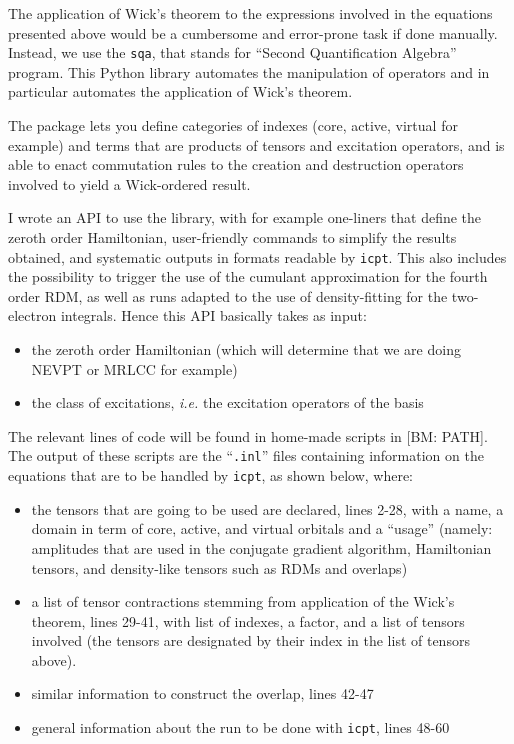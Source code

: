 \documentclass{article}
\newcommand  \todo[1]      {{\color{blue}[BM: #1]}}
\newcommand  \var[1]       {\texttt{#1}}
\begin{document}
The application of Wick's theorem to the expressions involved in the equations presented above
would be a cumbersome and error-prone task if done manually.
Instead, we use the \var{sqa}, that stands for ``Second Quantification Algebra'' program.
This Python library automates the manipulation of operators and in particular automates
the application of Wick's theorem.

The package lets you define categories of indexes (core, active, virtual for example)
and terms that are products of tensors and excitation operators,
and is able to enact commutation rules to the creation and destruction operators involved
to yield a Wick-ordered result.

I wrote an API to use the library, with for example one-liners that define the zeroth order Hamiltonian,
user-friendly commands to simplify the results obtained,
and systematic outputs in formats readable by \var{icpt}.
This also includes the possibility to trigger the use of the cumulant approximation for the fourth order RDM,
as well as runs adapted to the use of density-fitting for the two-electron integrals.
Hence this API basically takes as input:
\begin{itemize}
\item the zeroth order Hamiltonian (which will determine that we are doing NEVPT or MRLCC for example)
\item the class of excitations, \textit{i.e.} the excitation operators of the basis
\end{itemize}
The relevant lines of code will be found in home-made scripts in \todo{PATH}.
The output of these scripts are the ``\var{.inl}'' files containing information
on the equations that are to be handled by \var{icpt}, as shown below, where:
\begin{itemize}
\item the tensors that are going to be used are declared, lines 2-28, with
      a name, a domain in term of core, active, and virtual orbitals and a ``usage''
      (namely: amplitudes that are used in the conjugate gradient algorithm, Hamiltonian tensors,
       and density-like tensors such as RDMs and overlaps)
\item a list of tensor contractions stemming from application of the Wick's theorem, lines 29-41,
      with list of indexes, a factor, and a list of tensors involved
      (the tensors are designated by their index in the list of tensors above).
\item similar information to construct the overlap, lines 42-47
\item general information about the run to be done with \var{icpt}, lines 48-60
\end{itemize}
\end{document}
